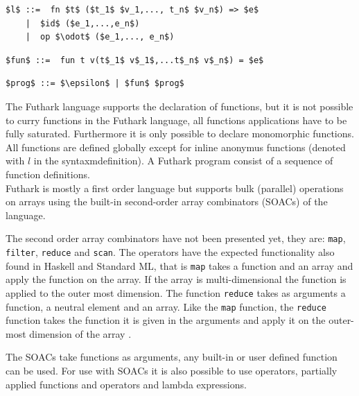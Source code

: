 \documentclass[11pt]{article}
\begin{document}
\begin{lstlisting}[numbers=none,frame=none]
$l$ ::=  fn $t$ ($t_1$ $v_1,..., t_n$ $v_n$) => $e$
    |  $id$ ($e_1,...,e_n$)
    |  op $\odot$ ($e_1,..., e_n$)
\end{lstlisting}

\begin{lstlisting}[numbers=none,frame=none]
$fun$ ::=  fun t v(t$_1$ v$_1$,...t$_n$ v$_n$) = $e$
\end{lstlisting}

\begin{lstlisting}[numbers=none,frame=none]
$prog$ ::= $\epsilon$ | $fun$ $prog$
\end{lstlisting}

The Futhark language supports the declaration of functions, but it is not possible to curry functions in the Futhark language, all functions applications have to be fully saturated. Furthermore it is only possible to declare monomorphic functions.
All functions are defined globally \cite{TroelsHenriksen} except for inline anonymus functions (denoted with $l$ in the syntaxmdefinition). A Futhark program consist of a sequence of function definitions. \\

Futhark is mostly a first order language but supports bulk (parallel) operations on arrays
using the built-in second-order array combinators (SOACs) of the language. 

The second order array combinators have not been presented yet, they are:
{\tt map}, {\tt filter}, {\tt reduce} and {\tt scan}.
The operators have the expected functionality also found in Haskell and Standard ML,
that is {\tt map} takes a function and an array and apply the function on the array.
If the array is multi-dimensional the function is applied to the outer most dimension.
The function {\tt reduce} takes as arguments a function, a neutral element and an array.
Like the {\tt map} function, the {\tt reduce} function takes the function it is given in the arguments
and apply it on the outer-most dimension of the array \cite{TroelsHenriksen}. 

The SOACs take functions as arguments, any built-in or user defined function can be used. For use with
SOACs it is also possible to use operators, partially applied functions and operators and lambda expressions.\\
\end{document}
